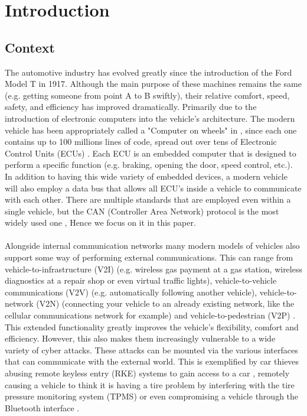 \chapter{Introduction}
\label{sec:introduction}

\section{Context}
\label{sec:context}

The automotive industry has evolved greatly since the introduction of the Ford Model T in 1917. Although the main purpose of these machines remains the same (e.g. getting someone from point A to B swiftly), their relative comfort, speed, safety, and efficiency has improved dramatically. Primarily due to the introduction of electronic computers into the vehicle's architecture. The modern vehicle has been appropriately called a "Computer on wheels" in \cite{Klinedinst05}, since each one contains up to 100 millions lines of code, spread out over tens of Electronic Control Units (ECUs) \cite{Pike15}. Each ECU is an embedded computer that is designed to perform a specific function (e.g. braking, opening the door, speed control, etc.). In addition to having this wide variety of embedded devices, a modern vehicle will also employ a data bus that allows all ECU's inside a vehicle to communicate with each other. There are multiple standards that are employed even within a single vehicle, but the CAN (Controller Area Network) protocol is the most widely used one \cite{VatiCAN}, Hence we focus on it in this paper. \\ \\ Alongside internal communication networks many modern models of vehicles also support some way of performing external communications. This can range from vehicle-to-infrastructure (V2I) (e.g. wireless gas payment at a gas station, wireless diagnostics at a repair shop or even virtual traffic lights), vehicle-to-vehicle communications (V2V) (e.g. automatically following another vehicle), vehicle-to-network (V2N) (connecting your vehicle to an already existing network, like the cellular communications network for example) and vehicle-to-pedestrian (V2P) \cite{Kleberger15,Russel17,Ahmed}. This extended functionality greatly improves the vehicle's flexibility, comfort and efficiency. However, this also makes them increasingly vulnerable to a wide variety of cyber attacks. These attacks can be mounted via the various interfaces that can communicate with the external world. This is exemplified by car thieves abusing remote keyless entry (RKE) systems to gain access to a car \cite{KeeLoq,MillerA}, remotely causing a vehicle to think it is having a tire problem by interfering with the tire pressure monitoring system (TPMS) \cite{MillerA} or even compromising a vehicle through the Bluetooth interface \cite{Kosher2,Kosher}. \\ \\
